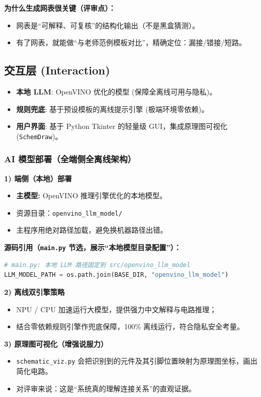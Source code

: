 \documentclass[a4paper,AutoFakeBold,oneside,12pt]{book}
\begin{document}
\textbf{为什么生成网表很关键（评审点）：}
\begin{itemize}
    \item 网表是“可解释、可复核”的结构化输出（不是黑盒猜测）。
    \item 有了网表，就能做“与老师范例模板对比”，精确定位：漏接/错接/短路。
\end{itemize}

\subsection{交互层 (Interaction)}
\begin{itemize}
    \item \textbf{本地 LLM}: OpenVINO 优化的模型 (保障全离线可用与隐私)。
    \item \textbf{规则兜底}: 基于预设模板的离线提示引擎 (极端环境零依赖)。
    \item \textbf{用户界面}: 基于 Python Tkinter 的轻量级 GUI，集成原理图可视化 (\texttt{SchemDraw})。
\end{itemize}

\subsubsection{AI 模型部署（全端侧全离线架构）}

\textbf{1) 端侧（本地）部署}
\begin{itemize}
    \item \textbf{主模型:} OpenVINO 推理引擎优化的本地模型。
    \item 资源目录：\texttt{openvino\_llm\_model/}
    \item 主程序用绝对路径加载，避免换机器路径出错。
\end{itemize}

\textbf{源码引用（\texttt{main.py} 节选，展示“本地模型目录配置”）：}
\begin{lstlisting}[language=Python]
# main.py: 本地 LLM 路径固定到 src/openvino_llm_model
LLM_MODEL_PATH = os.path.join(BASE_DIR, "openvino_llm_model")
\end{lstlisting}

\textbf{2) 离线双引擎策略}
\begin{itemize}
    \item NPU / CPU 加速运行大模型，提供强力中文解释与电路推理；
    \item 结合零依赖规则引擎作兜底保障，100\% 离线运行，符合隐私安全考量。
\end{itemize}

\textbf{3) 原理图可视化（增强说服力）}
\begin{itemize}
    \item \texttt{schematic\_viz.py} 会把识别到的元件及其引脚位置映射为原理图坐标，画出简化电路。
    \item 对评审来说：这是“系统真的理解连接关系”的直观证据。
\end{itemize}
\end{document}
